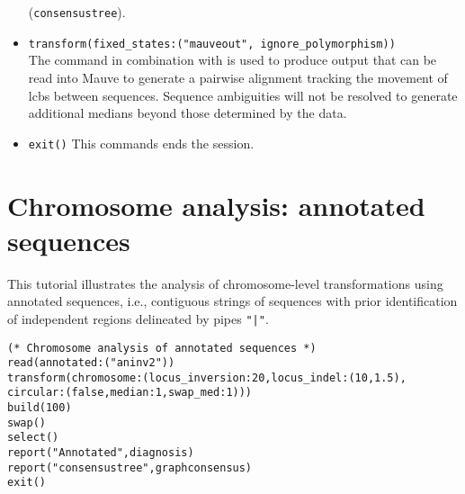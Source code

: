 \begin{itemize}
(\texttt{consensustree}). 
\item \texttt{transform(fixed\_states:("mauveout", ignore\_polymorphism))}  \\The {} command 
in combination with  is used to produce output that 
can be read into Mauve to generate a pairwise alignment tracking the movement of lcbs between sequences. 
Sequence ambiguities will not be resolved to generate additional medians beyond those determined by the data.
\item \texttt{exit()} This commands ends the \poy session.
\end{itemize}

\section{Chromosome analysis: annotated sequences}{\label{tutorial 7}}

This tutorial illustrates the analysis of chromosome-level transformations using 
annotated sequences, i.e., contiguous strings of sequences with prior 
identification of independent regions delineated by pipes  \texttt{"|"}. 

\begin{verbatim}
(* Chromosome analysis of annotated sequences *)
read(annotated:("aninv2"))
transform(chromosome:(locus_inversion:20,locus_indel:(10,1.5),
circular:(false,median:1,swap_med:1)))
build(100)
swap()
select()
report("Annotated",diagnosis)
report("consensustree",graphconsensus)
exit()
\end{verbatim}

